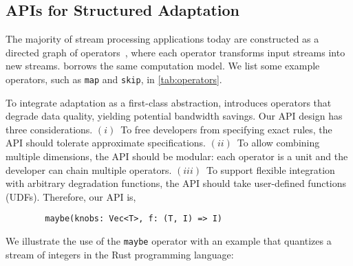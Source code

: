 \subsection{APIs for Structured Adaptation}
\label{sec:struct-adapt}

The majority of stream processing applications today are constructed as a
directed graph of operators~\cite{toshniwal2014storm, zaharia2013discretized},
where each operator transforms input streams into new streams. \sysname{}
borrows the same computation model. We list some example operators, such as
\texttt{map} and \texttt{skip}, in \autoref{tab:operators}.

To integrate adaptation as a first-class abstraction, \sysname{} introduces \maybe{} operators
that degrade data quality, yielding potential bandwidth savings.
Our API design has three considerations.
$(i)$~To free developers from specifying exact rules, the API should tolerate
approximate specifications. $(ii)$~To allow combining multiple dimensions, the API
should be modular: each operator is a unit and the developer can chain multiple
operators. $(iii)$~To support flexible integration with arbitrary degradation
functions, the API should take user-defined functions (UDFs). Therefore, our API
is,

\vspace{-2pt}
\begin{lstlisting}
        maybe(knobs: Vec<T>, f: (T, I) => I)
\end{lstlisting}

We illustrate the use of the \texttt{maybe} operator with an example that
quantizes a stream of integers in the Rust programming language:

